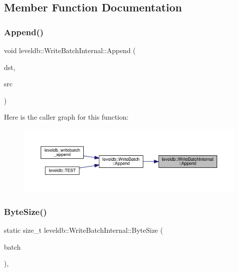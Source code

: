 \subsection{Member Function Documentation}
\mbox{\label{classleveldb_1_1_write_batch_internal_ac83c9a45a815c16ad8602b99b752b4bc}} 
\subsubsection{\texorpdfstring{Append()}{Append()}}
{\footnotesize\ttfamily void leveldb\+::\+Write\+Batch\+Internal\+::\+Append (\begin{DoxyParamCaption}\item[{\mbox{\hyperlink{classleveldb_1_1_write_batch}{Write\+Batch}} $\ast$}]{dst,  }\item[{const \mbox{\hyperlink{classleveldb_1_1_write_batch}{Write\+Batch}} $\ast$}]{src }\end{DoxyParamCaption})\hspace{0.3cm}{\ttfamily [static]}}

Here is the caller graph for this function\+:
\nopagebreak
\begin{figure}[H]
\begin{center}
\leavevmode
\includegraphics[width=350pt]{classleveldb_1_1_write_batch_internal_ac83c9a45a815c16ad8602b99b752b4bc_icgraph}
\end{center}
\end{figure}
\mbox{\label{classleveldb_1_1_write_batch_internal_adad424f13cc3e3ed4a2eacb88eaa39df}} 
\subsubsection{\texorpdfstring{ByteSize()}{ByteSize()}}
{\footnotesize\ttfamily static size\+\_\+t leveldb\+::\+Write\+Batch\+Internal\+::\+Byte\+Size (\begin{DoxyParamCaption}\item[{const \mbox{\hyperlink{classleveldb_1_1_write_batch}{Write\+Batch}} $\ast$}]{batch }\end{DoxyParamCaption})\hspace{0.3cm}{\ttfamily [inline]}, {\ttfamily [static]}}

